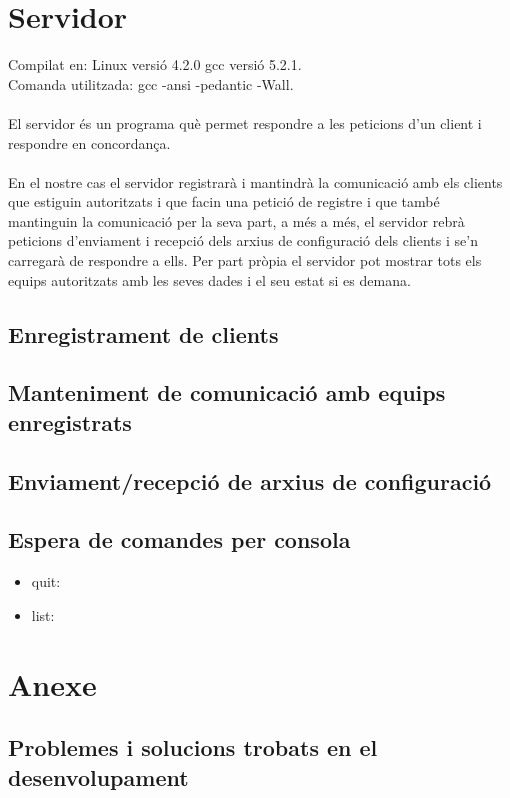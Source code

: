 \documentclass[11pt]{article}
\begin{document}
\newpage
\section{Servidor}
Compilat en: Linux versió 4.2.0 gcc versió 5.2.1.\\
Comanda utilitzada: gcc -ansi -pedantic -Wall.
\\\\
El servidor és un programa què permet respondre a les peticions d'un client i respondre en concordança.
\\\\
En el nostre cas el servidor registrarà i mantindrà la comunicació amb els clients que estiguin autoritzats i que facin una petició de registre i que també mantinguin la comunicació per la seva part, a més a més, el servidor rebrà peticions d'enviament i recepció dels arxius de configuració dels clients i se'n carregarà de respondre a ells. Per part pròpia el servidor pot mostrar tots els equips autoritzats amb les seves dades i el seu estat si es demana.
	\subsection{Enregistrament de clients}
	\subsection{Manteniment de comunicació amb equips enregistrats }
	\subsection{Enviament/recepció de arxius de configuració}
	\subsection{Espera de comandes per consola}
\begin{itemize}
\item quit:
\item list:
\end{itemize}
\newpage
\section{Anexe}
	\subsection{Problemes i solucions trobats en el desenvolupament}
\end{document}
